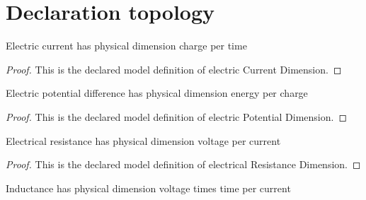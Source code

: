 \section{Declaration topology}
\begin{definition}
  \label{def:physics:phyx-mini-0988:phyxminiproblems-problemphyxmini0988-electriccurrentdimension}
  Electric current has physical dimension charge per time
\end{definition}
\begin{proof}
  This is the declared model definition of electric Current Dimension.
\end{proof}
\begin{definition}
  \label{def:physics:phyx-mini-0988:phyxminiproblems-problemphyxmini0988-electricpotentialdimension}
  Electric potential difference has physical dimension energy per charge
\end{definition}
\begin{proof}
  This is the declared model definition of electric Potential Dimension.
\end{proof}
\begin{definition}
  \label{def:physics:phyx-mini-0988:phyxminiproblems-problemphyxmini0988-electricalresistancedimension}
  Electrical resistance has physical dimension voltage per current
\end{definition}
\begin{proof}
  This is the declared model definition of electrical Resistance Dimension.
\end{proof}
\begin{definition}
  \label{def:physics:phyx-mini-0988:phyxminiproblems-problemphyxmini0988-inductancedimension}
  Inductance has physical dimension voltage times time per current
\end{definition}
